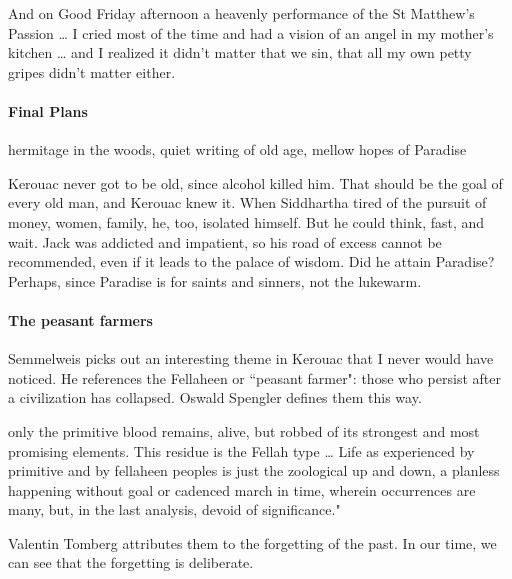 \begin{quotex}
And on Good Friday afternoon a heavenly performance of the St Matthew's Passion … I cried most of the time and had a vision of an angel in my mother's kitchen … and I realized it didn't matter that we sin, that all my own petty gripes didn't matter either. 

\end{quotex}
\paragraph{Final Plans}
\begin{quotex}
hermitage in the woods, quiet writing of old age, mellow hopes of Paradise 

\end{quotex}
Kerouac never got to be old, since alcohol killed him. That should be the goal of every old man, and Kerouac knew it. When Siddhartha tired of the pursuit of money, women, family, he, too, isolated himself. But he could think, fast, and wait. Jack was addicted and impatient, so his road of excess cannot be recommended, even if it leads to the palace of wisdom. Did he attain Paradise? Perhaps, since Paradise is for saints and sinners, not the lukewarm.

\paragraph{The peasant farmers}
Semmelweis picks out an interesting theme in Kerouac that I never would have noticed. He references the Fellaheen or ``peasant farmer": those who persist after a civilization has collapsed. Oswald Spengler defines them this way.

\begin{quotex}
only the primitive blood remains, alive, but robbed of its strongest and most promising elements. This residue is the Fellah type … Life as experienced by primitive and by fellaheen peoples is just the zoological up and down, a planless happening without goal or cadenced march in time, wherein occurrences are many, but, in the last analysis, devoid of significance." 

\end{quotex}
Valentin Tomberg attributes them to the forgetting of the past. In our time, we can see that the forgetting is deliberate.

